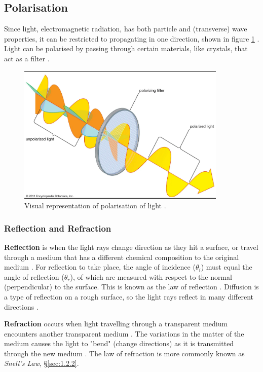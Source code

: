\documentclass[12pt]{article}
\begin{document}
\subsection{Polarisation} \label{sec:1.2}

Since light, electromagnetic radiation, has both particle and (transverse) wave properties, it can be restricted to propagating in one direction, shown in figure \ref{fig:polar}
\cite{isaacpolar,britpolar}.
Light can be polarised by passing through certain materials, like crystals, that act as a filter 
\cite{britpolar}.

\begin{figure}[H]
    \centering
    \includegraphics[width=10cm]{polarisation.png}
    \caption{\centering Visual representation of polarisation of light \protect\cite{britpolar}.}
    \label{fig:polar}
\end{figure}

\subsubsection{Reflection and Refraction} \label{sec:1.2.1}

\textbf{Reflection} is when the light rays change direction as they hit a surface, or travel through a medium that has a different chemical composition to the original medium
\cite{libreref,britref}.
For reflection to take place, the angle of incidence ($\theta_i$) must equal the angle of reflection ($\theta_r$), of which are measured with respect to the normal (perpendicular)
to the surface. This is known as the law of reflection
\cite{libreref,britref}.
Diffusion is a type of reflection on a rough surface, so the light rays reflect in many different directions
\cite{libreref}.

\textbf{Refraction} occurs when light travelling through a transparent medium encounters another transparent medium
\cite{britref}.
The variations in the matter of the medium causes the light to "bend" (change directions) as it is transmitted through the new medium
\cite{libreref}.
The law of refraction is more commonly known as \textit{Snell's Law}, §\ref{sec:1.2.2}.
\end{document}

